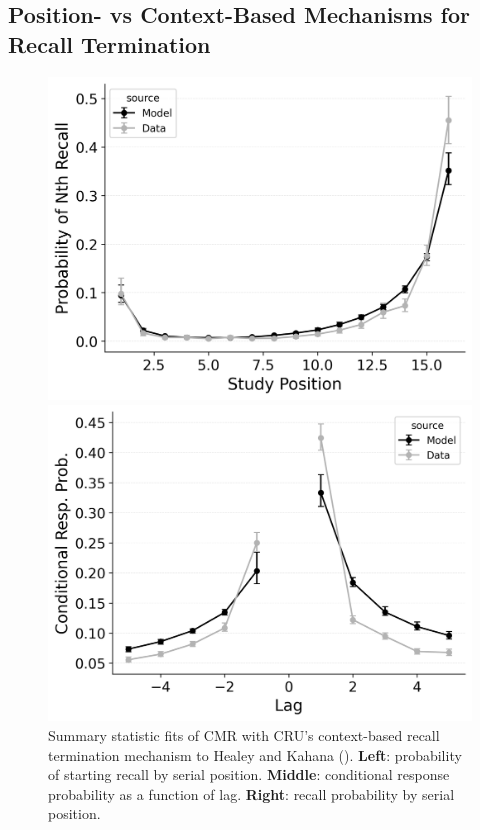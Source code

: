 \documentclass[
  man,
  floatsintext,
  longtable,
  nolmodern,
  notxfonts,
  notimes,
  draftfirst,
  colorlinks=true,linkcolor=blue,citecolor=blue,urlcolor=blue]{apa7}
\begin{document}
\subsection{Position- vs Context-Based Mechanisms for Recall
Termination}\label{position--vs-context-based-mechanisms-for-recall-termination}

\begin{figure}

\caption{\label{fig-freetermination}Summary statistic fits of CMR with
CRU's context-based recall termination mechanism to Healey and Kahana
(). \textbf{Left}: probability of
starting recall by serial position. \textbf{Middle}: conditional
response probability as a function of lag. \textbf{Right}: recall
probability by serial position.}

\begin{minipage}{0.33\linewidth}
\includegraphics{figures/bw_HealeyKahana2014_CRU_with_Feature-to-Context__Pre-Expt__Primacy_StartDrift__and_ContextTerm_Fitting_pnr.png}\end{minipage}%
%
\begin{minipage}{0.33\linewidth}
\includegraphics{figures/bw_HealeyKahana2014_CRU_with_Feature-to-Context__Pre-Expt__Primacy_StartDrift__and_ContextTerm_Fitting_crp.png}\end{minipage}%

\end{figure}
\end{document}
